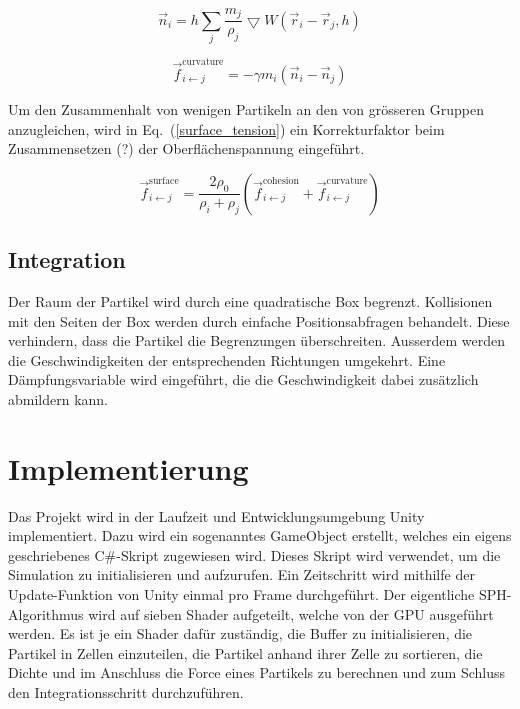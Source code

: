 \documentclass[a4paper]{paper}
\renewcommand{\eqref}[1]{Eq.~(\ref{#1})}
\begin{document}
\begin{equation}
\label{normal}
\vec{n}_{i} = h\sum_{j}\frac{m_{j}}{\rho_{j}}\bigtriangledown W (\vec{r}_{i}-\vec{r}_{j},h)
\end{equation}

\begin{equation}
\label{curvature}
\vec{f}_{i\leftarrow j}^{\text{curvature}} = -\gamma m_{i}(\vec{n}_i - \vec{n}_j)
\end{equation}

Um den Zusammenhalt von wenigen Partikeln an den von grösseren Gruppen anzugleichen, wird in \eqref{surface_tension} ein Korrekturfaktor beim Zusammensetzen (?) der Oberflächenspannung eingeführt.

\begin{equation}
	\label{surface_tension}
	\vec{f}_{i\leftarrow j}^{\text{surface}} = \frac{2\rho_{0}}{\rho_{i}+\rho_{j}} (\vec{f}_{i\leftarrow j}^{\text{cohesion}} + \vec{f}_{i\leftarrow j}^{\text{curvature}})
\end{equation}


\subsection{Integration}

Der Raum der Partikel wird durch eine quadratische Box begrenzt. Kollisionen mit den Seiten der Box werden durch einfache Positionsabfragen behandelt. Diese verhindern, dass die Partikel die Begrenzungen überschreiten. Ausserdem werden die Geschwindigkeiten der entsprechenden Richtungen umgekehrt. Eine Dämpfungsvariable wird eingeführt, die die Geschwindigkeit dabei zusätzlich abmildern kann.

\section{Implementierung}
Das Projekt wird in der Laufzeit und Entwicklungsumgebung Unity implementiert. Dazu wird ein sogenanntes GameObject erstellt, welches ein eigens geschriebenes C\#-Skript zugewiesen wird. Dieses Skript wird verwendet, um die Simulation zu initialisieren und aufzurufen. %
Ein Zeitschritt wird mithilfe der Update-Funktion von Unity einmal pro Frame durchgeführt. Der eigentliche SPH-Algorithmus wird auf sieben Shader aufgeteilt, welche von der GPU ausgeführt werden. Es ist je ein Shader dafür zuständig, die Buffer zu initialisieren, die Partikel in Zellen einzuteilen, die Partikel anhand ihrer Zelle zu sortieren, die Dichte und im Anschluss die Force eines Partikels zu berechnen und zum Schluss den Integrationsschritt durchzuführen.
\end{document}
